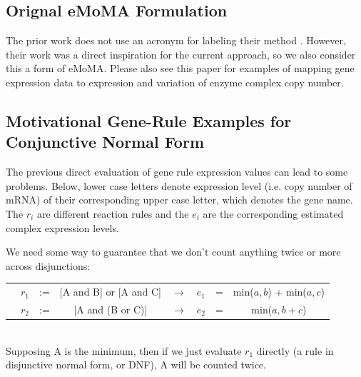 \documentclass[phd,tocprelim]{cornell}
\theoremstyle{break}
\begin{document}
\vspace{5 mm} 


\subsection{Orignal eMoMA Formulation}

The prior work does not use an acronym for labeling their method \cite{Lee2012}.
However, their work was a direct inspiration for the current approach, 
so we also consider this a form of eMoMA. Please also see this paper for examples
of mapping gene expression data to expression and variation of enzyme complex
copy number.

\subsection{Motivational Gene-Rule Examples for Conjunctive Normal Form}
The previous direct evaluation of gene rule expression values can lead to some problems.
Below, lower case letters denote expression level (i.e. copy number of mRNA) of their
corresponding upper case letter, which denotes the gene name. The $r_i$ are different reaction
rules and the $e_i$ are the corresponding estimated complex expression levels.

We need some way to guarantee that we don’t count anything twice or more across disjunctions: \\
\begin{tabular}{cccccccc}
& $r_1$ & := & [A and B] or [A and C] & $\rightarrow$ & $e_1$  &=& min($a,b$) + min($a,c$) \\ 
& $r_2$ & := & [A and (B or C)]       & $\rightarrow$ & $e_2$  &=&  min($a, b + c$) 
\end{tabular} \\
Supposing A is the minimum, then if we just evaluate $r_1$ directly (a rule in 
disjunctive normal form, or DNF), A will be counted twice. 
\end{document}
